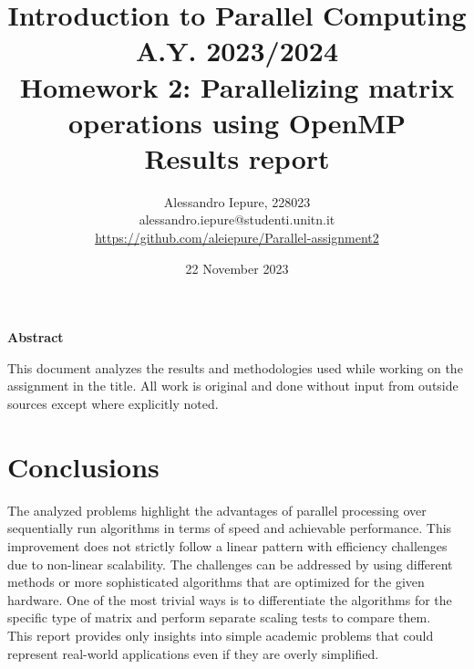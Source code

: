 \documentclass{article}
\begin{document}
    \title{Introduction to Parallel Computing\\%
    A.Y. 2023/2024\\%
    Homework 2: Parallelizing matrix operations using OpenMP\\%
    \textbf{Results report}}
    \author{%
        Alessandro Iepure, 228023\\%
        alessandro.iepure@studenti.unitn.it\\%
        \url{https://github.com/aleiepure/Parallel-assignment2}
    }
    \date{22 November 2023}
    \maketitle

    \begin{center}
        \textbf{Abstract}
    \end{center}
    This document analyzes the results and methodologies used while working on %
    the assignment in the title. All work is original and done without input %
    from outside sources except where explicitly noted.

    
    
    \clearpage

    \section*{Conclusions}
    The analyzed problems highlight the advantages of parallel processing %
    over sequentially run algorithms in terms of speed and achievable performance. %
    This improvement does not strictly follow a linear pattern with efficiency challenges %
    due to non-linear scalability. The challenges can be addressed by using %
    different methods or more sophisticated algorithms that are optimized %
    for the given hardware. One of the most trivial ways is to differentiate the %
    algorithms for the specific type of matrix and perform separate scaling tests to %
    compare them.\\%
    This report provides only insights into simple academic problems that could %
    represent real-world applications even if they are overly simplified.
    
    \printbibliography
\end{document}
